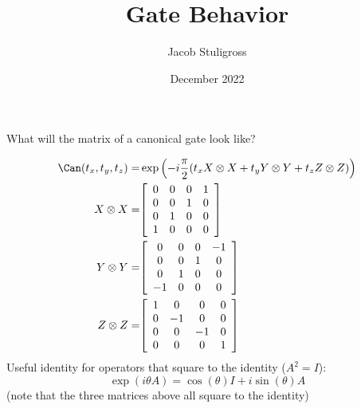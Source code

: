 \documentclass{article}
\title{Gate Behavior}
\author{Jacob Stuligross}
\date{December 2022}
\begin{document}
\maketitle

What will the matrix of a canonical gate look like?

\begin{align*}
  \Can(t_x,t_y,t_z) =& \exp\pqty{-i\frac{\pi}{2}\pqty{t_x X\otimes X + t_y Y\otimes Y + t_z Z\otimes Z}} \\
  X \otimes X =&
  \bqty{
  \begin{array}{cccc}
    0&0&0&1 \\
    0&0&1&0 \\
    0&1&0&0 \\
    1&0&0&0 \\
  \end{array}
  } \\
  Y \otimes Y =&
  \bqty{
  \begin{array}{cccc}
    0&0&0&-1 \\
    0&0&1&0 \\
    0&1&0&0 \\
    -1&0&0&0 \\
  \end{array}
  } \\
  Z \otimes Z =&
  \bqty{
  \begin{array}{cccc}
    1&0&0&0 \\
    0&-1&0&0 \\
    0&0&-1&0 \\
    0&0&0&1 \\
  \end{array}
  }
\end{align*}
Useful identity for operators that square to the identity ($A^2 = I$):
$$
\exp(i\theta A) = \cos(\theta) I + i\sin(\theta) A
$$
(note that the three matrices above all square to the identity)
\end{document}
